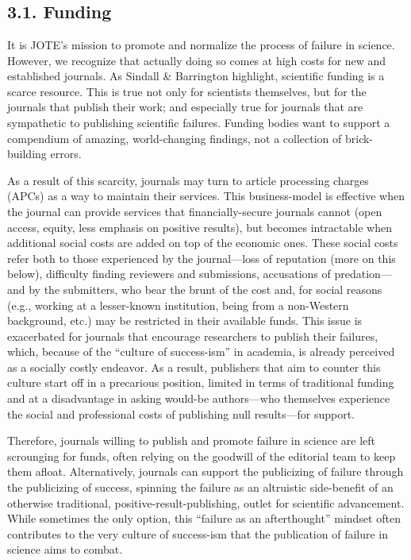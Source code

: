 \documentclass[empirical, author-date]{jote-article}
\begin{document}
\section{\textbf{}}

\subsection{3.1. Funding}

It is JOTE's mission to promote and normalize the process of failure in science. However, we recognize that actually doing so comes at high costs for new and established journals. As Sindall \& Barrington highlight, scientific funding is a scarce resource. This is true not only for scientists themselves, but for the journals that publish their work; and especially true for journals that are sympathetic to publishing scientific failures. Funding bodies want to support a compendium of amazing, world-changing findings, not a collection of brick-building errors. 

As a result of this scarcity, journals may turn to article processing charges (APCs) as a way to maintain their services. This business-model is effective when the journal can provide services that financially-secure journals cannot (open access, equity, less emphasis on positive results), but becomes intractable when additional social costs are added on top of the economic ones. These social costs refer both to those experienced by the journal—loss of reputation (more on this below), difficulty finding reviewers and submissions, accusations of predation—and by the submitters, who bear the brunt of the cost and, for social reasons (e.g., working at a lesser-known institution, being from a non-Western background, etc.) may be restricted in their available funds. This issue is exacerbated for journals that encourage researchers to publish their failures, which, because of the “culture of success-ism” in academia, is already perceived as a socially costly endeavor. As a result, publishers that aim to counter this culture start off in a precarious position, limited in terms of traditional funding and at a disadvantage in asking would-be authors—who themselves experience the social and professional costs of publishing null results—for support. 

Therefore, journals willing to publish and promote failure in science are left scrounging for funds, often relying on the goodwill of the editorial team to keep them afloat. Alternatively, journals can support the publicizing of failure through the publicizing of success, spinning the failure as an altruistic side-benefit of an otherwise traditional, positive-result-publishing, outlet for scientific advancement. While sometimes the only option, this “failure as an afterthought” mindset often contributes to the very culture of success-ism that the publication of failure in science aims to combat. 
\end{document}
